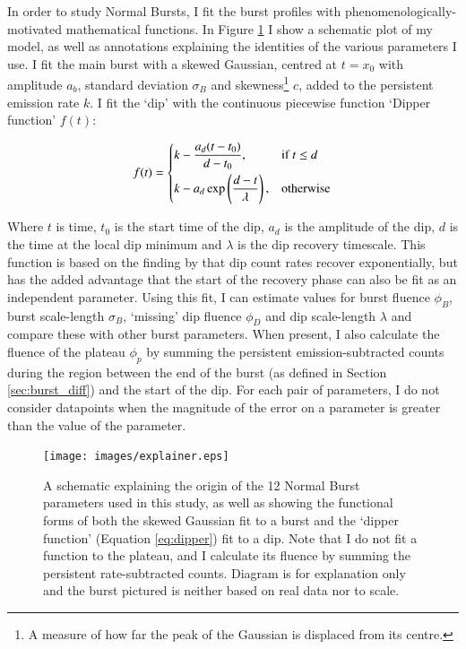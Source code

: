 \par In order to study Normal Bursts, I fit the burst profiles with phenomenologically-motivated mathematical functions.  In Figure \ref{fig:explain} I show a schematic plot of my model, as well as annotations explaining the identities of the various parameters I use.  I fit the main burst with a skewed Gaussian, centred at $t=x_0$ with amplitude $a_b$, standard deviation $\sigma_B$ and skewness\footnote{A measure of how far the peak of the Gaussian is displaced from its centre.} $c$, added to the persistent emission rate $k$.  I fit the `dip' with the continuous piecewise function `Dipper function' $f(t)$:

\begin{equation}
f(t)=
\begin{dcases}
k-\frac{a_d(t-t_0)}{d-t_0}, & \text{if } t\leq d\\
k-a_d\exp\left(\frac{d-t}{\lambda}\right), & \text{otherwise}
\end{dcases}
\label{eq:dipper}
\end{equation}

Where $t$ is time, $t_0$ is the start time of the dip, $a_d$ is the amplitude of the dip, $d$ is the time at the local dip minimum and $\lambda$ is the dip recovery timescale.  This function is based on the finding by \citet{Younes_Expo} that dip count rates recover exponentially, but has the added advantage that the start of the recovery phase can also be fit as an independent parameter.  Using this fit, I can estimate values for burst fluence $\phi_B$, burst scale-length $\sigma_B$, `missing' dip fluence $\phi_D$ and dip scale-length $\lambda$ and compare these with other burst parameters.  When present, I also calculate the fluence of the plateau $\phi_p$ by summing the persistent emission-subtracted counts during the region between the end of the burst (as defined in Section \ref{sec:burst_diff}) and the start of the dip.  For each pair of parameters, I do not consider datapoints when the magnitude of the error on a parameter is greater than the value of the parameter.

\begin{figure}
  \centering
  \texttt{[image: images/explainer.eps]}
  \caption[A schematic explaining the origin of the 12 Normal Burst parameters used in this study.]{\small A schematic explaining the origin of the 12 Normal Burst parameters used in this study, as well as showing the functional forms of both the skewed Gaussian fit to a burst and the `dipper function' (Equation \ref{eq:dipper}) fit to a dip.  Note that I do not fit a function to the plateau, and I calculate its fluence by summing the persistent rate-subtracted counts.  Diagram is for explanation only and the burst pictured is neither based on real data nor to scale.}
  \label{fig:explain}
\end{figure}

